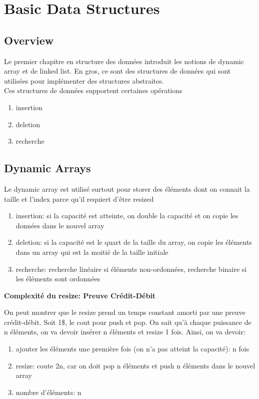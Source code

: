 \documentclass{article}
\begin{document}
\section{Basic Data Structures}

\subsection{Overview}

Le premier chapitre en structure des données introduit les notions de
dynamic array et de linked list. En gros, ce sont des structures de
données qui sont utilisées pour implémenter des structures abstraites.\\

Ces structures de données supportent certaines opérations
\begin{enumerate}
    \item insertion
    \item deletion
    \item recherche
\end{enumerate}

\subsection{Dynamic Arrays}

Le dynamic array est utilisé surtout pour storer des éléments dont on
connait la taille et l'index parce qu'il requiert d'être resized

\begin{enumerate}
    \item insertion: si la capacité est atteinte, on double la capacité
	et on copie les données dans le nouvel array
    \item deletion: si la capacité est le quart de la taille du array,
	on copie les éléments dans un array qui est la moitié de la
	taille initiale
    \item recherche: recherche linéaire si éléments non-ordonnées,
	recherche binaire si les éléments sont ordonnées
\end{enumerate}

\textbf{Complexité du resize: Preuve Crédit-Débit}

On peut montrer que le resize prend un temps constant amorti par une
preuve crédit-débit. Soit 1\$, le cout pour push et pop.
On sait qu'à chaque puissance de n éléments, on va devoir insérer n éléments
et resize 1 fois. Ainsi, on va devoir:
\begin{enumerate}
    \item ajouter les éléments une première fois (on n'a pas atteint la
	capacité): n fois
    \item resize: coute 2n, car on doit pop n éléments et push n éléments
	dans le nouvel array
    \item nombre d'éléments: n
\end{enumerate}
\end{document}
